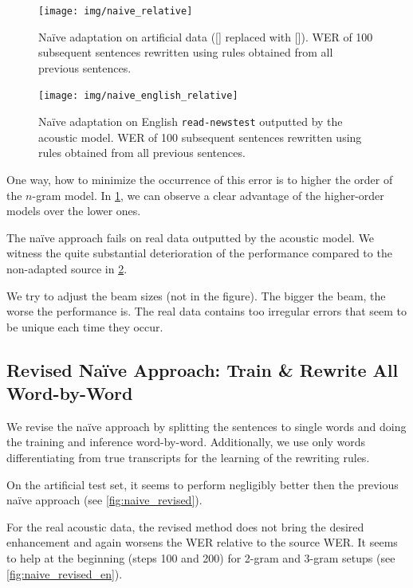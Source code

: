 \begin{figure}[h]
    \texttt{[image: img/naive\_relative]}
    \caption{Na\"ive adaptation on artificial data ([] replaced with []). WER of 100 subsequent sentences rewritten using rules obtained from all previous sentences.}
    \label{fig:naive} 
\end{figure}

\begin{figure}[h]
    \texttt{[image: img/naive\_english\_relative]}
    \caption{Na\"ive adaptation on English \texttt{read-newstest} outputted by the acoustic model. WER of 100 subsequent sentences rewritten using rules obtained from all previous sentences.}
    \label{fig:naive_en} 
\end{figure}

One way, how to minimize the occurrence of this error is to higher the order of the $n$-gram model. In \cref{fig:naive}, we can observe a clear advantage of the higher-order models over the lower ones.

The na\"ive approach fails on real data outputted by the acoustic model. We witness the quite substantial deterioration of the performance compared to the non-adapted source in \cref{fig:naive_en}. 

We try to adjust the beam sizes (not in the figure). The bigger the beam, the worse the performance is. The real data contains too irregular errors that seem to be unique each time they occur.

\subsection[Revised Na\"ive Approach: Train \& Rewrite All Word-by-Word]{Revised Na\"ive Approach: Train \& Rewrite All \\Word-by-Word}
We revise the na\"ive approach by splitting the sentences to single words and doing the training and inference word-by-word. Additionally, we use only words differentiating from true transcripts for the learning of the rewriting rules. 

On the artificial test set, it seems to perform negligibly better then the previous na\"ive approach (see \cref{fig:naive_revised}).

For the real acoustic data, the revised method does not bring the desired enhancement and again worsens the WER relative to the source WER. It seems to help at the beginning (steps 100 and 200) for 2-gram and 3-gram setups (see \cref{fig:naive_revised_en}). 

